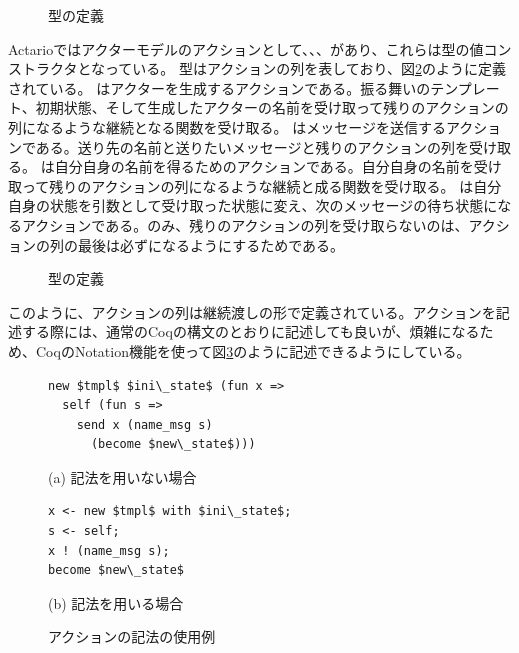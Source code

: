 \begin{figure}
  
  \label{code:overview:behavior}
  \caption{型の定義}
\end{figure}

Actarioではアクターモデルのアクションとして、、、があり、これらは型の値コンストラクタとなっている。
型はアクションの列を表しており、図\ref{code:overview:actions}のように定義されている。
はアクターを生成するアクションである。振る舞いのテンプレート、初期状態、そして生成したアクターの名前を受け取って残りのアクションの列になるような継続となる関数を受け取る。
はメッセージを送信するアクションである。送り先の名前と送りたいメッセージと残りのアクションの列を受け取る。
は自分自身の名前を得るためのアクションである。自分自身の名前を受け取って残りのアクションの列になるような継続と成る関数を受け取る。
は自分自身の状態を引数として受け取った状態に変え、次のメッセージの待ち状態になるアクションである。のみ、残りのアクションの列を受け取らないのは、アクションの列の最後は必ずになるようにするためである。

\begin{figure}
  
  \label{code:overview:actions}
  \caption{型の定義}
\end{figure}

このように、アクションの列は継続渡しの形で定義されている。アクションを記述する際には、通常のCoqの構文のとおりに記述しても良いが、煩雑になるため、CoqのNotation機能を使って図\ref{code:overview:notation}のように記述できるようにしている。

\begin{figure}\centering
\begin{minipage}{0.42\textwidth}\centering
\begin{lstlisting}[frame=single,numbers=none,xleftmargin=0pt]
new $tmpl$ $ini\_state$ (fun x =>
  self (fun s =>
    send x (name_msg s)
      (become $new\_state$)))
\end{lstlisting}
(a) 記法を用いない場合
\end{minipage}
\hspace*{3ex}
\begin{minipage}{0.42\textwidth}\centering
\begin{lstlisting}[frame=single,numbers=none,xleftmargin=0pt]
x <- new $tmpl$ with $ini\_state$;
s <- self;
x ! (name_msg s);
become $new\_state$
\end{lstlisting}
(b) 記法を用いる場合
\end{minipage}
\caption{アクションの記法の使用例}\label{code:overview:notation}
\end{figure}



